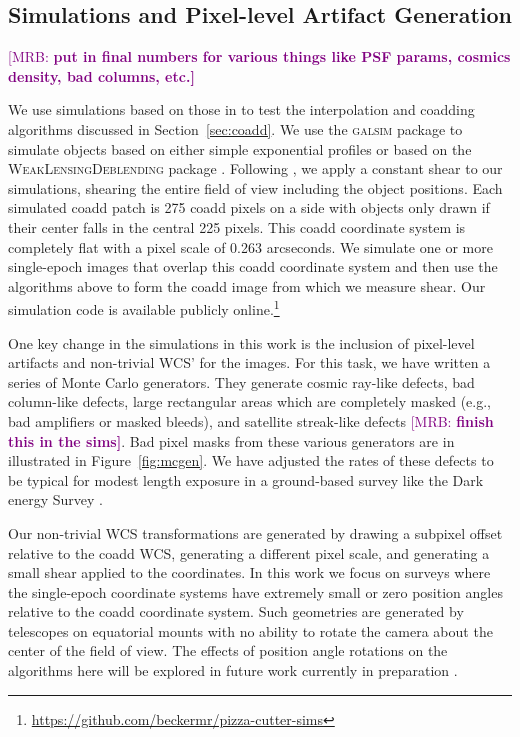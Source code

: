 \documentclass[twocolappendix, appendixfloats, numberedappendix, twocolumn, apj]{openjournal}
\newcommand{\mrb}[1]{\textcolor{purple}{[MRB: \bf #1]}\xspace}
\newcommand{\galsim}{\textsc{galsim}\xspace}
\newcommand{\descwl}{\textsc{WeakLensingDeblending}\xspace}
\begin{document}
\subsection{Simulations and Pixel-level Artifact Generation}

\mrb{put in final numbers for various things like PSF params, cosmics density, bad columns, etc.}

We use simulations based on those in \citet{mdet} to test the interpolation and coadding algorithms
discussed in Section~\ref{sec:coadd}. We use the \galsim package \citep{GALSIM2015} to simulate
objects based on either simple exponential profiles or based on the \descwl package
\citep{WeakLensingDeblendingPaper,WeakLensingDeblendingSoftware}. Following \citet{mdet}, we apply a constant shear
to our simulations, shearing the entire field of view including the object positions. Each simulated coadd patch is
275 coadd pixels on a side with objects only drawn if their center falls in the central 225 pixels. This coadd coordinate
system is completely flat with a pixel scale of 0.263 arcseconds. We simulate one or more single-epoch images that overlap this
coadd coordinate system and then use the algorithms above to form the coadd image from which we measure shear.
Our simulation code is available publicly online.\footnote{\url{https://github.com/beckermr/pizza-cutter-sims}}

One key change in the simulations in this work is the inclusion of pixel-level artifacts and non-trivial
WCS' for the images. For this task, we have written a series of Monte Carlo generators. They generate
cosmic ray-like defects, bad column-like defects, large rectangular areas which are completely masked (e.g.,
bad amplifiers or masked bleeds), and satellite streak-like defects \mrb{finish this in the sims}. Bad pixel
masks from these various generators are in illustrated in Figure~\ref{fig:mcgen}. We have adjusted the rates
of these defects to be typical for modest length exposure in a ground-based survey like the Dark energy Survey
\citep{des}.

Our non-trivial WCS transformations are generated by drawing a subpixel offset relative to the coadd WCS,
generating a different pixel scale, and generating a small shear applied to the coordinates. In this work we focus on
surveys where the single-epoch coordinate systems have extremely small or zero position angles relative to the
coadd coordinate system. Such geometries are generated by telescopes on equatorial mounts with no ability to rotate the
camera about the center of the field of view. The effects of position angle rotations on the algorithms
here will be explored in future work currently in preparation \citep{sheldoninprep}.
\end{document}
